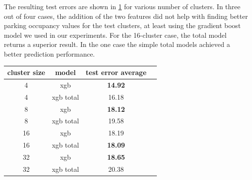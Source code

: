 \documentclass{ws-ijait}
\begin{document}
	The resulting test errors are shown in \cref{tab:extended_models_comparison} for various number of clusters. In three out of four cases, the addition of the two features did not help with finding better parking occupancy values for the test clusters, at least using the gradient boost model we used in our experiments. For the 16-cluster case, the total model returns a superior result. In the one case the simple total models achieved a better prediction performance. 
	
	\begin{table}[!ht]
		{\begin{tabular}{ | c | c | c | c | }
				\hline		
				\textbf{cluster size}  & \textbf{model} & \textbf{test error average} \\ \hline
				4 & {xgb} & \textbf{14.92} \\ \hline
				4 & {xgb total} & 16.18 \\ \hline \hline
				8 & {xgb} & \textbf{18.12} \\ \hline
				8 & {xgb total} & 19.58 \\ \hline \hline
				16 & {xgb} & 18.19 \\ \hline
				16 & {xgb total} & \textbf{18.09} \\ \hline \hline
				32 & {xgb} & \textbf{18.65} \\ \hline
				32 & {xgb total} & 20.38 \\ \hline
		\end{tabular}}
		\label{tab:extended_models_comparison}
	\end{table}
			
\end{document}
